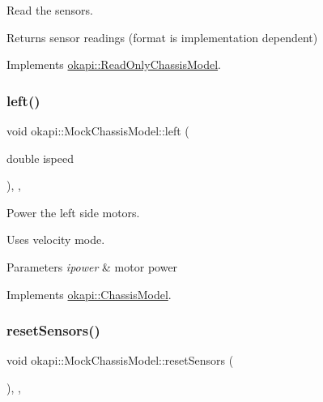 Read the sensors. 

\begin{DoxyReturn}{Returns}
sensor readings (format is implementation dependent) 
\end{DoxyReturn}


Implements \mbox{\hyperlink{classokapi_1_1ReadOnlyChassisModel_af2d844d9e12bb7c778ac9a5a0074f848}{okapi\+::\+Read\+Only\+Chassis\+Model}}.

\mbox{\label{classokapi_1_1MockChassisModel_a829d2392f492d3336ac786f09b27702c}} 
\subsubsection{\texorpdfstring{left()}{left()}}
{\footnotesize\ttfamily void okapi\+::\+Mock\+Chassis\+Model\+::left (\begin{DoxyParamCaption}\item[{double}]{ispeed }\end{DoxyParamCaption})\hspace{0.3cm}{\ttfamily [inline]}, {\ttfamily [override]}, {\ttfamily [virtual]}}



Power the left side motors. 

Uses velocity mode.


\begin{DoxyParams}{Parameters}
{\em ipower} & motor power \\
\hline
\end{DoxyParams}


Implements \mbox{\hyperlink{classokapi_1_1ChassisModel_aa2008856c169eb64c6648bc64c31c504}{okapi\+::\+Chassis\+Model}}.

\mbox{\label{classokapi_1_1MockChassisModel_a5f0d81938cd6c5ceffa4606836cb010b}} 
\subsubsection{\texorpdfstring{resetSensors()}{resetSensors()}}
{\footnotesize\ttfamily void okapi\+::\+Mock\+Chassis\+Model\+::reset\+Sensors (\begin{DoxyParamCaption}{ }\end{DoxyParamCaption})\hspace{0.3cm}{\ttfamily [inline]}, {\ttfamily [override]}, {\ttfamily [virtual]}}




